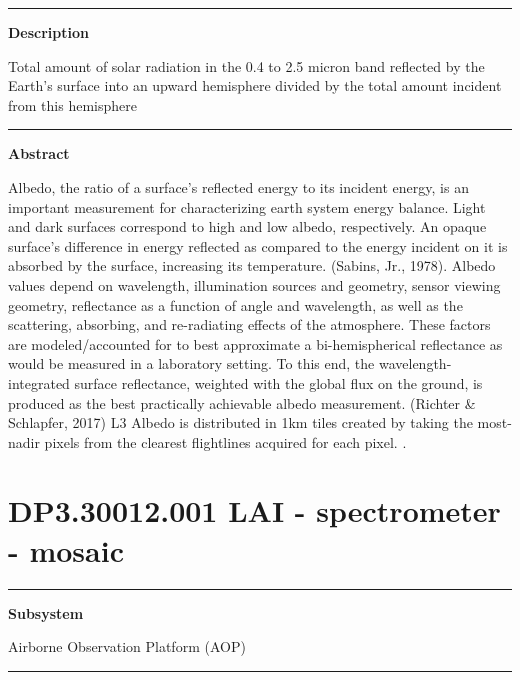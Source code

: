\documentclass[]{article}
\begin{document}
\begin{center}\rule{0.5\linewidth}{\linethickness}\end{center}

\textbf{Description}

Total amount of solar radiation in the 0.4 to 2.5 micron band reflected
by the Earth's surface into an upward hemisphere divided by the total
amount incident from this hemisphere

\begin{center}\rule{0.5\linewidth}{\linethickness}\end{center}

\textbf{Abstract}

Albedo, the ratio of a surface's reflected energy to its incident
energy, is an important measurement for characterizing earth system
energy balance. Light and dark surfaces correspond to high and low
albedo, respectively. An opaque surface's difference in energy reflected
as compared to the energy incident on it is absorbed by the surface,
increasing its temperature. (Sabins, Jr., 1978). Albedo values depend on
wavelength, illumination sources and geometry, sensor viewing geometry,
reflectance as a function of angle and wavelength, as well as the
scattering, absorbing, and re-radiating effects of the atmosphere. These
factors are modeled/accounted for to best approximate a bi-hemispherical
reflectance as would be measured in a laboratory setting. To this end,
the wavelength-integrated surface reflectance, weighted with the global
flux on the ground, is produced as the best practically achievable
albedo measurement. (Richter \& Schlapfer, 2017) L3 Albedo is
distributed in 1km tiles created by taking the most-nadir pixels from
the clearest flightlines acquired for each pixel. \newpage
.

\section{DP3.30012.001 LAI - spectrometer -
mosaic}\label{dp3.30012.001-lai---spectrometer---mosaic}

\begin{center}\rule{0.5\linewidth}{\linethickness}\end{center}

\textbf{Subsystem}

Airborne Observation Platform (AOP)

\begin{center}\rule{0.5\linewidth}{\linethickness}\end{center}
\end{document}
